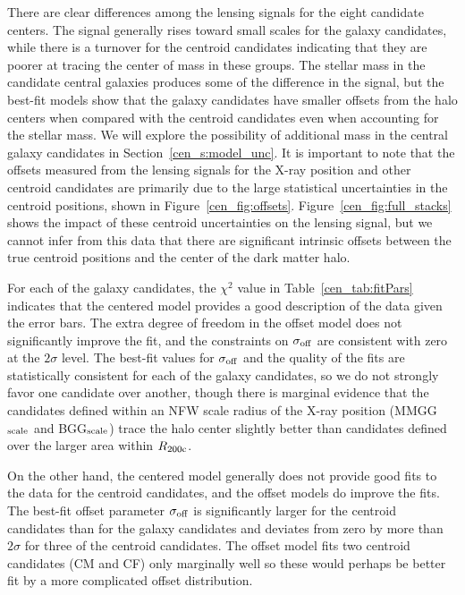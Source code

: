 There are clear differences among the lensing signals for the eight
candidate centers. The signal generally rises toward small scales for
the galaxy candidates, while there is a turnover for the centroid
candidates indicating that they are poorer at tracing the center of
mass in these groups. The stellar mass in the candidate central
galaxies produces some of the difference in the signal, but the
best-fit models show that the galaxy candidates have smaller offsets
from the halo centers when compared with the centroid candidates even
when accounting for the stellar mass. We will explore the possibility
of additional mass in the central galaxy candidates in
Section~\ref{cen_s:model_unc}. It is important to note that the offsets
measured from the lensing signals for the X-ray position and other
centroid candidates are primarily due to the large statistical
uncertainties in the centroid positions, shown in
Figure~\ref{cen_fig:offsets}. Figure~\ref{cen_fig:full_stacks} shows the
impact of these centroid uncertainties on the lensing signal, but we
cannot infer from this data that there are significant intrinsic
offsets between the true centroid positions and the center of the dark
matter halo.

For each of the galaxy candidates, the $\chi^2$ value
  in Table~\ref{cen_tab:fitPars} indicates that the centered model
  provides a good description of the data given the error bars. The
  extra degree of freedom in the offset model does not significantly
  improve the fit, and the constraints on $\sigma_{\rm off}$ are
  consistent with zero at the $2\sigma$ level. The best-fit values for
  $\sigma_{\rm off}$ and the quality of the fits are statistically
  consistent for each of the galaxy candidates, so we do not strongly
  favor one candidate over another, though there is marginal evidence
  that the candidates defined within an NFW scale radius of the X-ray
  position (MMGG$_{\rm scale}$ and BGG$_{\rm scale}$) trace the halo
  center slightly better than candidates defined over the larger area
  within $R_{\rm 200c}$.
 
On the other hand, the centered model generally does not provide good
fits to the data for the centroid candidates, and the offset models do
improve the fits. The best-fit offset parameter
  $\sigma_{\rm off}$ is significantly larger for the centroid candidates than for the galaxy
  candidates and deviates from zero by more than $2\sigma$ for three
  of the centroid candidates. The offset model fits
  two centroid candidates (CM and CF) only marginally well so these
would perhaps be better fit by a more complicated offset distribution.

